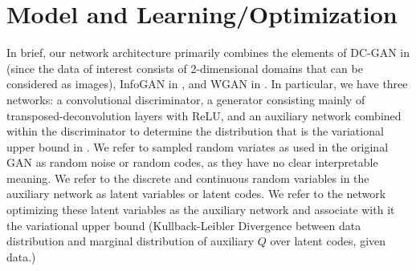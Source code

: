 \documentclass{article}
\begin{document}
\section{Model and Learning/Optimization}\label{opt}
	In brief, our network architecture primarily combines the elements of DC-GAN in \cite{Radford2015UnsupervisedNetworks} (since the data of interest consists of 2-dimensional domains that can be considered as images), InfoGAN in %
, and WGAN in \cite{Arjovsky2017WassersteinGAN}. In particular, we have three networks: a convolutional discriminator, a generator consisting mainly of transposed-deconvolution layers with ReLU, and an auxiliary network combined within the discriminator to determine the distribution that is the variational upper bound in %
.  We refer to sampled random variates as used in the original GAN as random noise or random codes, as they have no clear interpretable meaning.  We refer to the discrete and continuous random variables in the auxiliary network as latent variables or latent codes.  We refer to the network optimizing these latent variables as the auxiliary network and associate with it the variational upper bound (Kullback-Leibler Divergence between data distribution and marginal distribution of auxiliary $Q$ over latent codes, given data.) 
\end{document}
